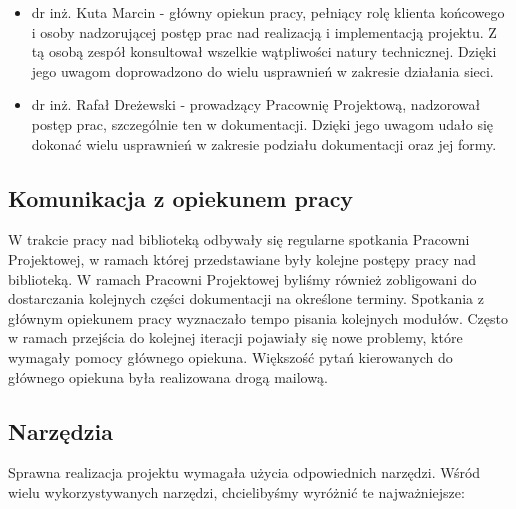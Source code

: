 \begin{itemize}
  \item dr inż. Kuta Marcin - główny opiekun pracy, pełniący rolę klienta końcowego i osoby nadzorującej
  postęp prac nad realizacją i implementacją projektu. Z tą osobą zespół konsultował wszelkie wątpliwości
  natury technicznej. Dzięki jego uwagom doprowadzono do wielu usprawnień w zakresie działania sieci.
  \item dr inż. Rafał Dreżewski - prowadzący Pracownię Projektową, nadzorował postęp prac, 
  szczególnie ten w dokumentacji. Dzięki jego uwagom udało się dokonać wielu usprawnień w zakresie podziału
  dokumentacji oraz jej formy.
\end{itemize}

\subsection{Komunikacja z opiekunem pracy}
W trakcie pracy nad biblioteką odbywały się regularne spotkania Pracowni Projektowej, w ramach której 
przedstawiane były kolejne postępy pracy nad biblioteką. W ramach Pracowni Projektowej byliśmy również
zobligowani do dostarczania kolejnych części dokumentacji na określone terminy. Spotkania z głównym
opiekunem pracy wyznaczało tempo pisania kolejnych modułów. Często w ramach przejścia do kolejnej iteracji
pojawiały się nowe problemy, które wymagały pomocy głównego opiekuna. Większość pytań kierowanych do 
głównego opiekuna była realizowana drogą mailową. 

\subsection{Narzędzia}
Sprawna realizacja projektu wymagała użycia odpowiednich narzędzi. Wśród wielu wykorzystywanych narzędzi,
chcielibyśmy wyróżnić te najważniejsze:

